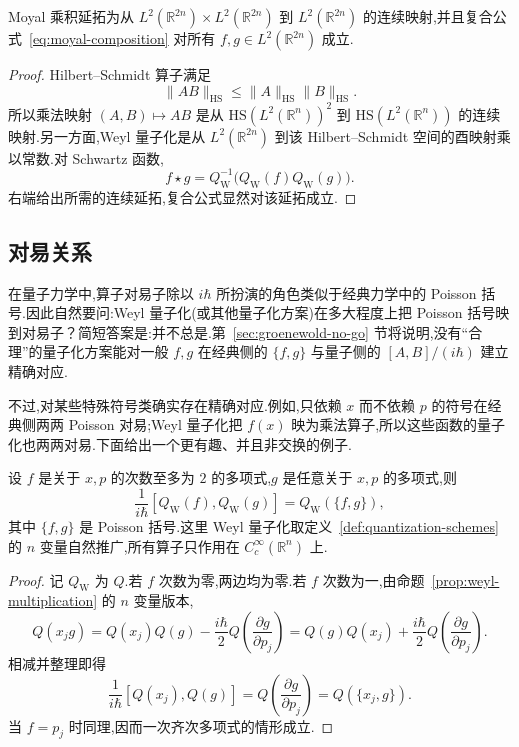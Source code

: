 {\begin{proposition}\label{prop:moyal-continuous}
Moyal 乘积延拓为从 $L^2(\mathbb R^{2n})\times L^2(\mathbb R^{2n})$ 到 $L^2(\mathbb R^{2n})$ 的连续映射,并且复合公式~\eqref{eq:moyal-composition} 对所有 $f,g\in L^2(\mathbb R^{2n})$ 成立.
\end{proposition}

\begin{proof}
Hilbert--Schmidt 算子满足
\[
\|AB\|_{\mathrm{HS}}\leq\|A\|_{\mathrm{HS}}\|B\|_{\mathrm{HS}}.
\]
所以乘法映射 $(A,B)\mapsto AB$ 是从 $\mathrm{HS}(L^2(\mathbb R^n))^2$ 到 $\mathrm{HS}(L^2(\mathbb R^n))$ 的连续映射.另一方面,Weyl 量子化是从 $L^2(\mathbb R^{2n})$ 到该 Hilbert--Schmidt 空间的酉映射乘以常数.对 Schwartz 函数,
\[
f\star g=Q_{\mathrm W}^{-1}\bigl(Q_{\mathrm W}(f)Q_{\mathrm W}(g)\bigr).
\]
右端给出所需的连续延拓,复合公式显然对该延拓成立.
\end{proof}

\subsection{对易关系}
\label{subsec:weyl-commutation}

在量子力学中,算子对易子除以 $i\hbar$ 所扮演的角色类似于经典力学中的 Poisson 括号.因此自然要问:Weyl 量子化(或其他量子化方案)在多大程度上把 Poisson 括号映到对易子？简短答案是:并不总是.第~\ref{sec:groenewold-no-go} 节将说明,没有“合理”的量子化方案能对一般 $f,g$ 在经典侧的 $\{f,g\}$ 与量子侧的 $[A,B]/(i\hbar)$ 建立精确对应.

不过,对某些特殊符号类确实存在精确对应.例如,只依赖 $x$ 而不依赖 $p$ 的符号在经典侧两两 Poisson 对易;Weyl 量子化把 $f(x)$ 映为乘法算子,所以这些函数的量子化也两两对易.下面给出一个更有趣、并且非交换的例子.

\begin{proposition}\label{prop:weyl-poisson-commutator}
设 $f$ 是关于 $x,p$ 的次数至多为 $2$ 的多项式,$g$ 是任意关于 $x,p$ 的多项式,则
\[
\frac1{i\hbar}[Q_{\mathrm W}(f),Q_{\mathrm W}(g)]
=Q_{\mathrm W}(\{f,g\}),
\label{eq:weyl-poisson-commutator}
\]
其中 $\{f,g\}$ 是 Poisson 括号.这里 Weyl 量子化取定义~\ref{def:quantization-schemes} 的 $n$ 变量自然推广,所有算子只作用在 $C_c^\infty(\mathbb R^n)$ 上.
\end{proposition}

\begin{proof}
记 $Q_{\mathrm W}$ 为 $Q$.若 $f$ 次数为零,两边均为零.若 $f$ 次数为一,由命题~\ref{prop:weyl-multiplication} 的 $n$ 变量版本,
\[
Q(x_jg)=Q(x_j)Q(g)-\frac{i\hbar}{2}Q\left(\frac{\partial g}{\partial p_j}\right)
=Q(g)Q(x_j)+\frac{i\hbar}{2}Q\left(\frac{\partial g}{\partial p_j}\right).
\]
相减并整理即得
\[
\frac1{i\hbar}[Q(x_j),Q(g)]=Q\left(\frac{\partial g}{\partial p_j}\right)=Q(\{x_j,g\}).
\]
当 $f=p_j$ 时同理,因而一次齐次多项式的情形成立.


\end{proof}}
